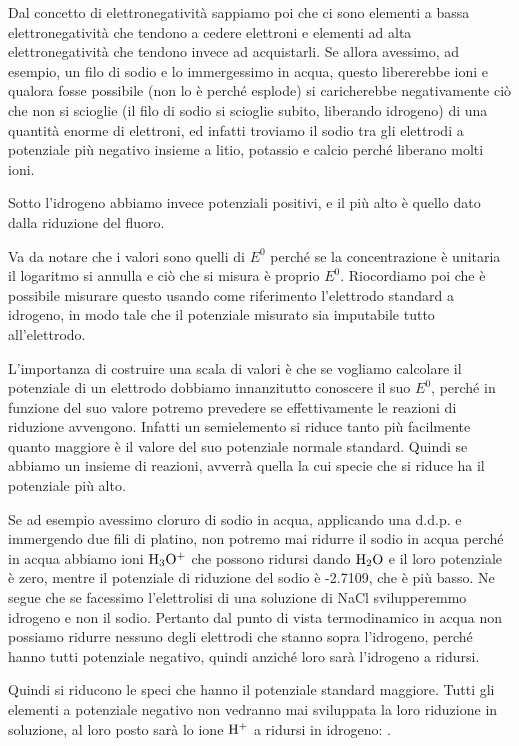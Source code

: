 Dal concetto di elettronegatività sappiamo poi che ci sono elementi a bassa elettronegatività che tendono a cedere elettroni e elementi ad alta elettronegatività che tendono invece ad acquistarli. Se allora avessimo, ad esempio, un filo di sodio e lo immergessimo in acqua, questo libererebbe ioni e qualora fosse possibile (non lo è perché esplode) si caricherebbe negativamente ciò che non si scioglie (il filo di sodio si scioglie subito, liberando idrogeno) di una quantità enorme di elettroni, ed infatti troviamo il sodio tra gli elettrodi a potenziale più negativo insieme a litio, potassio e calcio perché liberano molti ioni.

Sotto l'idrogeno abbiamo invece potenziali positivi, e il più alto è quello dato dalla riduzione del fluoro.

Va da notare che i valori sono quelli di $E^0$ perché se la concentrazione è unitaria il logaritmo si annulla e ciò che si misura è proprio $E^0$. Riocordiamo poi che è possibile misurare questo usando come riferimento l'elettrodo standard a idrogeno, in modo tale che il potenziale misurato sia imputabile tutto all'elettrodo.

L'importanza di costruire una scala di valori è che se vogliamo calcolare il potenziale di un elettrodo dobbiamo innanzitutto conoscere il suo $E^0$, perché in funzione del suo valore potremo prevedere se effettivamente le reazioni di riduzione avvengono. Infatti un semielemento si riduce tanto più facilmente quanto maggiore è il valore del suo potenziale normale standard. Quindi se abbiamo un insieme di reazioni, avverrà quella la cui specie che si riduce ha il potenziale più alto.

Se ad esempio avessimo cloruro di sodio in acqua, applicando una d.d.p. e immergendo due fili di platino, non potremo mai ridurre il sodio in acqua perché in acqua abbiamo ioni $\rm H_3O^+$ che possono ridursi dando $\rm H_2O$ e il loro potenziale è zero, mentre il potenziale di riduzione del sodio è -2.7109, che è più basso. Ne segue che se facessimo l'elettrolisi di una soluzione di NaCl svilupperemmo idrogeno e non il sodio. Pertanto dal punto di vista termodinamico in acqua non possiamo ridurre nessuno degli elettrodi che stanno sopra l'idrogeno, perché hanno tutti potenziale negativo, quindi anziché loro sarà l'idrogeno a ridursi.

\vspace{0.2cm}Quindi si riducono le speci che hanno il potenziale standard maggiore. Tutti gli elementi a potenziale negativo non vedranno mai sviluppata la loro riduzione in soluzione, al loro posto sarà lo ione $\rm H^+$ a ridursi in idrogeno: .

